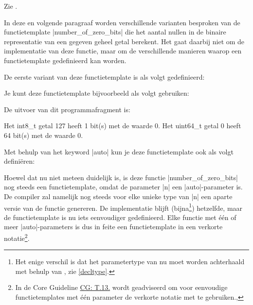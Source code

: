 \begin{cpplstShortInline}
Zie .

\label{sec:template_auto}
In deze en volgende paragraaf worden verschillende varianten besproken van de functietemplate |number_of_zero_bits| die het aantal nullen in de binaire representatie van een gegeven geheel getal berekent.
Het gaat daarbij niet om de implementatie van deze functie, maar om de verschillende manieren waarop een functietemplate gedefinieerd kan worden.

De eerste variant van deze functietemplate  is als volgt gedefinieerd:
\label{code:number_of_zero_bits1}

Je kunt deze functietemplate bijvoorbeeld als volgt gebruiken:

De uitvoer van dit programmafragment is:
\begin{coutput}
Het int8_t getal 127 heeft 1 bit(s) met de waarde 0.
Het uint64_t getal 0 heeft 64 bit(s) met de waarde 0.
\end{coutput}

Met behulp van het keyword |auto| kun je deze functietemplate ook als volgt definiëren:\label{prog:number_of_zero_bits2}

Hoewel dat nu niet meteen duidelijk is, is deze functie |number_of_zero_bits| nog steeds een functietemplate, omdat de parameter |n| een |auto|\hyp{}parameter is.
De compiler zal namelijk nog steeds voor elke unieke type van |n| een aparte versie van de functie genereren.
De implementatie blijft (bijna\footnote{%
	Het enige verschil is dat het parametertype van  nu moet worden achterhaald met behulp van , zie \cref{decltype}.
}) hetzelfde, maar de functietemplate is nu iets eenvoudiger gedefinieerd.
Elke functie met één of meer |auto|\hyp{}parameters is dus in feite een functietemplate in een verkorte notatie\footnote{%
	In de \Cpp{} Core Guideline \href{https://isocpp.github.io/CppCoreGuidelines/CppCoreGuidelines\#t13-prefer-the-shorthand-notation-for-simple-single-type-argument-concepts}{CG: T.13.} wordt geadviseerd om voor eenvoudige functietemplates met één parameter de verkorte notatie met  te gebruiken., 
}.


\end{cpplstShortInline}
